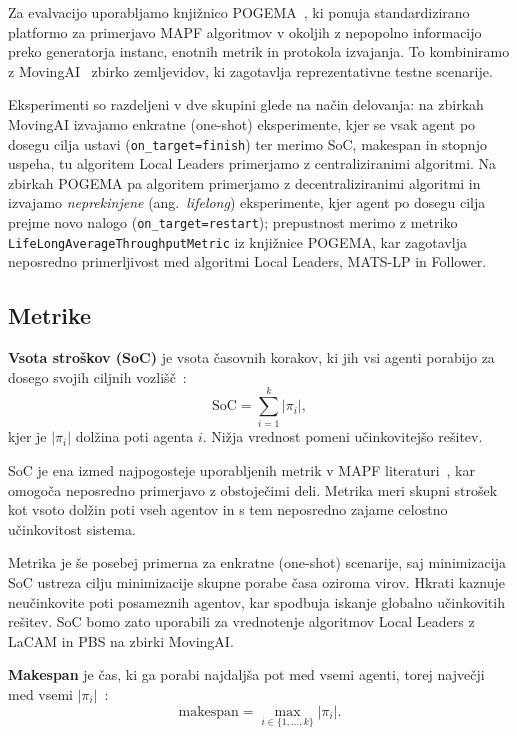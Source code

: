 \documentclass[sigconf,nonacm]{acmart}
\begin{document}
Za evalvacijo uporabljamo knjižnico POGEMA~\cite{skrynnik2025pogema}, ki ponuja standardizirano platformo za primerjavo MAPF algoritmov
v okoljih z nepopolno informacijo preko generatorja instanc, enotnih metrik in protokola izvajanja. To kombiniramo z MovingAI~\cite{stern2019multiagent}
zbirko zemljevidov, ki zagotavlja reprezentativne testne scenarije.

Eksperimenti so razdeljeni v dve skupini glede na način delovanja: na zbirkah MovingAI izvajamo enkratne (one-shot) eksperimente, kjer se vsak agent po dosegu cilja
ustavi (\texttt{on\_target=finish}) ter merimo SoC, makespan in stopnjo uspeha, tu algoritem Local 
Leaders primerjamo z centraliziranimi algoritmi. Na zbirkah
POGEMA pa algoritem primerjamo z decentraliziranimi algoritmi in izvajamo \textit{neprekinjene} (ang.\ \textit{lifelong}) eksperimente, kjer agent po
dosegu cilja prejme novo nalogo (\texttt{on\_target=restart}); prepustnost merimo z metriko
\texttt{LifeLongAverageThroughputMetric} iz knjižnice POGEMA, kar zagotavlja neposredno
primerljivost med algoritmi Local Leaders, MATS-LP in Follower.

\subsection{Metrike}

\textbf{Vsota stroškov (SoC)} je vsota časovnih korakov, ki jih vsi agenti porabijo za dosego svojih ciljnih vozlišč~\cite{stern2019multiagent}:
\[
    \text{SoC} = \sum_{i=1}^{k} |\pi_i|,
\]
kjer je $|\pi_i|$ dolžina poti agenta $i$. Nižja vrednost pomeni učinkovitejšo
rešitev. 
\vspace{0.5em}

SoC je ena izmed najpogosteje uporabljenih metrik v MAPF literaturi~\cite{stern2019multiagent}, kar omogoča neposredno primerjavo z obstoječimi deli. 
Metrika meri skupni strošek kot vsoto dolžin poti vseh agentov in s tem neposredno zajame celostno učinkovitost sistema.

Metrika je še posebej primerna za enkratne (one-shot) scenarije, saj minimizacija SoC ustreza cilju minimizacije skupne porabe časa oziroma virov. Hkrati 
kaznuje neučinkovite poti posameznih agentov, kar spodbuja iskanje globalno učinkovitih rešitev. SoC bomo zato uporabili za vrednotenje algoritmov 
Local Leaders z LaCAM in PBS na zbirki MovingAI.

\vspace{0.5em}
\noindent
\textbf{Makespan} je čas, ki ga porabi najdaljša pot med vsemi agenti, torej
največji med vsemi $|\pi_i|$~\cite{stern2019multiagent}:
\[
    \text{makespan} = \max_{i \in \{1,\dots,k\}} |\pi_i|.
\]
\end{document}
